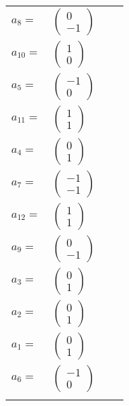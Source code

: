 \documentclass[1p]{elsarticle_modified}
\theoremstyle{definition}
\begin{document}
\begin{tabular}{m{7pt} m{180pt} m{7pt} m{180pt} }
\flushright $a_{8}=$&$\begin{pmatrix}0\\-1\end{pmatrix}$ \\
\flushright $a_{10}=$&$\begin{pmatrix}1\\0\end{pmatrix}$ \\
\flushright $a_{5}=$&$\begin{pmatrix}-1\\0\end{pmatrix}$ \\
\flushright $a_{11}=$&$\begin{pmatrix}1\\1\end{pmatrix}$ \\
\flushright $a_{4}=$&$\begin{pmatrix}0\\1\end{pmatrix}$ \\
\flushright $a_{7}=$&$\begin{pmatrix}-1\\-1\end{pmatrix}$ \\
\flushright $a_{12}=$&$\begin{pmatrix}1\\1\end{pmatrix}$ \\
\flushright $a_{9}=$&$\begin{pmatrix}0\\-1\end{pmatrix}$ \\
\flushright $a_{3}=$&$\begin{pmatrix}0\\1\end{pmatrix}$ \\
\flushright $a_{2}=$&$\begin{pmatrix}0\\1\end{pmatrix}$ \\
\flushright $a_{1}=$&$\begin{pmatrix}0\\1\end{pmatrix}$ \\
\flushright $a_{6}=$&$\begin{pmatrix}-1\\0\end{pmatrix}$\\&\end{tabular}
\end{document}
